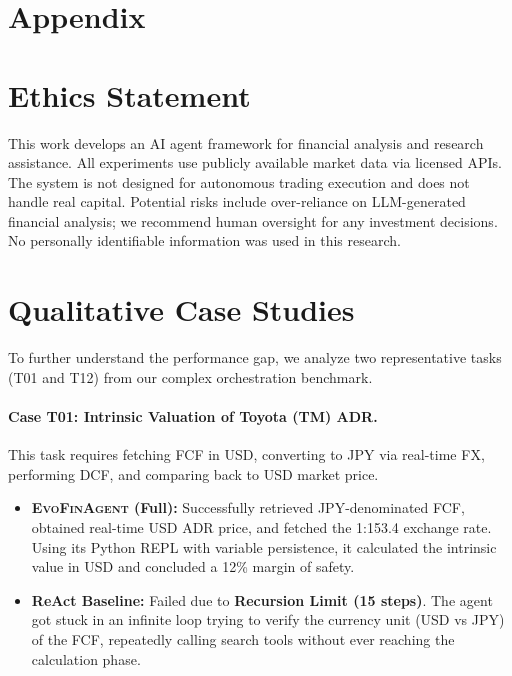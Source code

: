 \documentclass{article}
\begin{document}
\medskip

{
\small


}

\newpage
\appendix
\section*{Appendix}

\section{Ethics Statement}
This work develops an AI agent framework for financial analysis and research assistance. All experiments use publicly available market data via licensed APIs. The system is not designed for autonomous trading execution and does not handle real capital. Potential risks include over-reliance on LLM-generated financial analysis; we recommend human oversight for any investment decisions. No personally identifiable information was used in this research.

\section{Qualitative Case Studies}
To further understand the performance gap, we analyze two representative tasks (T01 and T12) from our complex orchestration benchmark.

\paragraph{Case T01: Intrinsic Valuation of Toyota (TM) ADR.}
This task requires fetching FCF in USD, converting to JPY via real-time FX, performing DCF, and comparing back to USD market price.
\begin{itemize}
    \item \textbf{\textsc{EvoFinAgent} (Full):} Successfully retrieved JPY-denominated FCF, obtained real-time USD ADR price, and fetched the 1:153.4 exchange rate. Using its Python REPL with variable persistence, it calculated the intrinsic value in USD and concluded a 12\% margin of safety.
    \item \textbf{ReAct Baseline:} Failed due to \textbf{Recursion Limit (15 steps)}. The agent got stuck in an infinite loop trying to verify the currency unit (USD vs JPY) of the FCF, repeatedly calling search tools without ever reaching the calculation phase.
\end{itemize}
\end{document}
